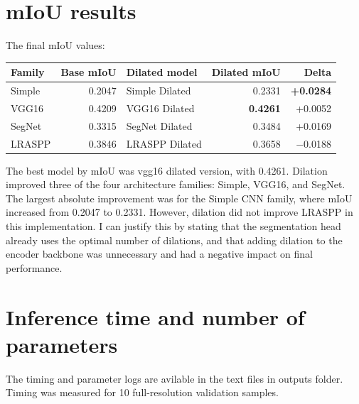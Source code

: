 \documentclass[12pt]{article}
\begin{document}
\section{mIoU results}
The final mIoU values:

\begin{center}
\small
\renewcommand{\arraystretch}{1.25}
\begin{tabular}{|l|r|l|r|r|}
\hline
\textbf{Family} & \textbf{Base mIoU} & \textbf{Dilated model} & \textbf{Dilated mIoU} & \textbf{Delta} \\
\hline
Simple & 0.2047 & Simple Dilated & 0.2331 & \textbf{ +0.0284} \\
VGG16 & 0.4209 & VGG16 Dilated & \textbf{0.4261} & +0.0052 \\
SegNet & 0.3315 & SegNet Dilated & 0.3484 & +0.0169 \\
LRASPP & 0.3846 & LRASPP Dilated & 0.3658 & \textbf{$-$}0.0188 \\
\hline
\end{tabular}
\end{center}

The best model by mIoU was vgg16 dilated version, with 0.4261. Dilation improved three of the four architecture families: Simple, VGG16, and SegNet. The largest absolute improvement was for the Simple CNN family, where mIoU increased from 0.2047 to 0.2331. However, dilation did not improve LRASPP in this implementation. I can justify this by stating that the segmentation head already uses the optimal number of dilations, and that adding dilation to the encoder backbone was unnecessary and had a negative impact on final performance.

\section{Inference time and number of parameters}
The timing and parameter logs are avilable in the text files in outputs folder. Timing was measured for 10 full-resolution validation samples.

\begin{center}
\small
\renewcommand{\arraystretch}{1.25}
\end{center}
\end{document}
